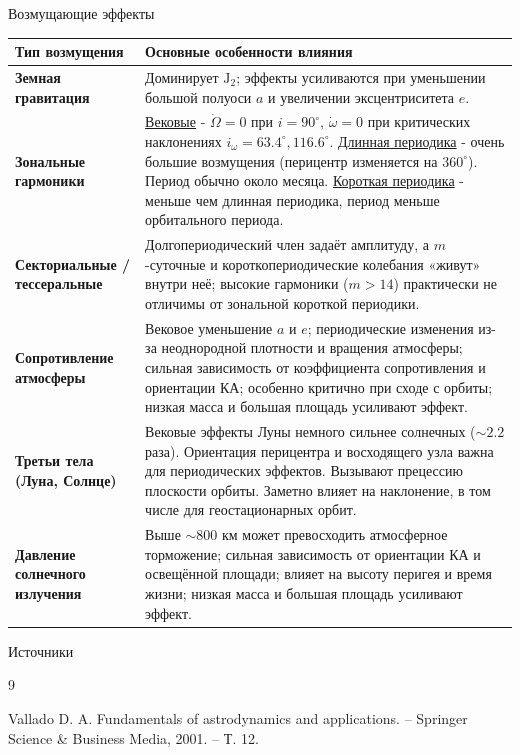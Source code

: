 \documentclass[8pt]{beamer}
\begin{document}
\begin{frame}{Возмущающие эффекты}
\begin{table}[h]
\centering
\begin{tabularx}{\textwidth}{>{\bfseries}p{}X}
\toprule
Тип возмущения & Основные особенности влияния \\
\midrule
Земная гравитация &
Доминирует $\text{J}_2$; эффекты усиливаются при уменьшении большой полуоси $a$
и увеличении эксцентриситета $e$. \\[0.3em]

Зональные гармоники &
\underline{Вековые} - $\dot{\Omega} = 0$ при $i = 90^\circ$, $\dot{\omega} = 0$ при критических наклонениях $i_\omega = 63.4^\circ, 116.6^\circ$. 
\underline{Длинная периодика} - очень большие возмущения (перицентр изменяется на $360^\circ$). Период обычно около месяца.
\underline{Короткая периодика} - меньше чем длинная периодика, период меньше орбитального периода. \\[0.3em]

Секториальные / тессеральные &
Долгопериодический член задаёт амплитуду, а $m$-суточные и короткопериодические колебания «живут» внутри неё; высокие гармоники ($m > 14$) практически не отличимы от зональной короткой периодики. \\[0.3em]

Сопротивление атмосферы &
Вековое уменьшение $a$ и $e$; периодические изменения из-за неоднородной
плотности и вращения атмосферы; сильная зависимость от коэффициента
сопротивления и ориентации КА; особенно критично при сходе с орбиты;
низкая масса и большая площадь усиливают эффект. \\[0.3em]

Третьи тела (Луна, Солнце) &
Вековые эффекты Луны немного сильнее солнечных ($\sim 2.2$ раза). Ориентация перицентра и восходящего узла важна для периодических эффектов. Вызывают прецессию плоскости орбиты. Заметно влияет на наклонение, в том числе для геостационарных орбит. \\[0.3em]

Давление солнечного излучения &
Выше $\sim 800$ км может превосходить атмосферное торможение; сильная
зависимость от ориентации КА и освещённой площади; влияет на высоту
перигея и время жизни; низкая масса и большая площадь усиливают эффект. \\
\bottomrule
\end{tabularx}
\end{table}
\end{frame}

\begin{frame}[allowframebreaks]{Источники}
  \begin{thebibliography}{9}

    Vallado D. A. Fundamentals of astrodynamics and applications. – Springer Science \& Business Media, 2001. – Т. 12.
    
  \end{thebibliography}
\end{frame}
\end{document}
